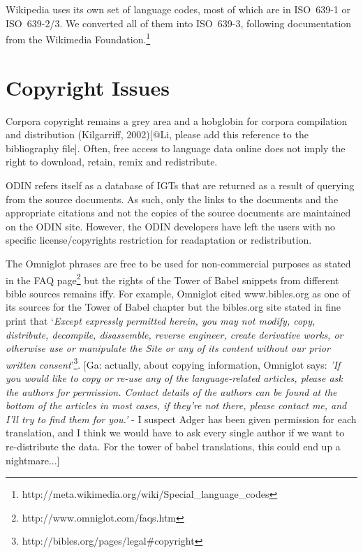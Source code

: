 \documentclass[11pt]{article}
\begin{document}
Wikipedia uses its own set of language codes, most of which are in ISO~639-1 or ISO~639-2/3. We converted all of them into ISO~639-3, following documentation from the Wikimedia Foundation.\footnote{http://meta.wikimedia.org/wiki/Special\_language\_codes}


\section{Copyright Issues} \label{sec:copyright}

Corpora copyright remains a grey area and a hobglobin for corpora compilation and distribution (Kilgarriff, 2002)[@Li, please add this reference to the bibliography file]. Often, free access to language data online does not imply the right to download, retain, remix and redistribute. 

ODIN refers itself as a database of IGTs that are returned as a result of querying from the source documents. As such, only the links to the documents and the appropriate citations and not the copies of the source documents are maintained on the ODIN site. However, the ODIN developers have left the users with no specific license/copyrights restriction for readaptation or redistribution.

The Omniglot phrases are free to be used for non-commercial purposes as stated in the FAQ page\footnote{http://www.omniglot.com/faqs.htm} but the rights of the Tower of Babel snippets from different bible sources remains iffy. For example, Omniglot cited www.bibles.org as one of its sources for the Tower of Babel chapter but the bibles.org site stated in fine print that `\emph{Except expressly permitted herein, you may not modify, copy, distribute, decompile, disassemble, reverse engineer, create derivative works, or otherwise use or manipulate the Site or any of its content without our prior written consent}'\footnote{http://bibles.org/pages/legal\#copyright}. [Ga: actually, about copying information, Omniglot says: \emph{'If you would like to copy or re-use any of the language-related articles, please ask the authors for permission. Contact details of the authors can be found at the bottom of the articles in most cases, if they're not there, please contact me, and I'll try to find them for you.'} - I suspect Adger has been given permission for each translation, and I think we would have to ask every single author if we want to re-distribute the data.  For the tower of babel translations, this could end up a nightmare...]
\end{document}
